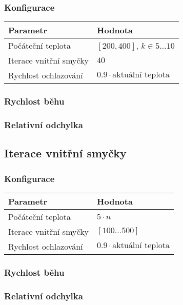 \documentclass[czech]{article}
\begin{document}
\subsubsection*{Konfigurace}

\begin{tabular}{ | l | l | }
    \hline
    Parametr & Hodnota \\ \hline \hline
    Počáteční teplota & $[200, 400]$, $k \in 5\dots10$ \\
    Iterace vnitřní smyčky & $40$ \\
    Rychlost ochlazování & $0.9 \cdot \textrm{aktuální teplota}$ \\ \hline
\end{tabular}

\subsubsection*{Rychlost běhu}

\subsubsection*{Relativní odchylka}

\subsection{Iterace vnitřní smyčky}

\subsubsection*{Konfigurace}

\begin{tabular}{ | l | l | }
    \hline
    Parametr & Hodnota \\ \hline \hline
    Počáteční teplota & $5 \cdot n$ \\
    Iterace vnitřní smyčky & $[100\dots500]$ \\
    Rychlost ochlazování & $0.9 \cdot \textrm{aktuální teplota}$ \\ \hline
\end{tabular}

\subsubsection*{Rychlost běhu}

\subsubsection*{Relativní odchylka}
\end{document}
